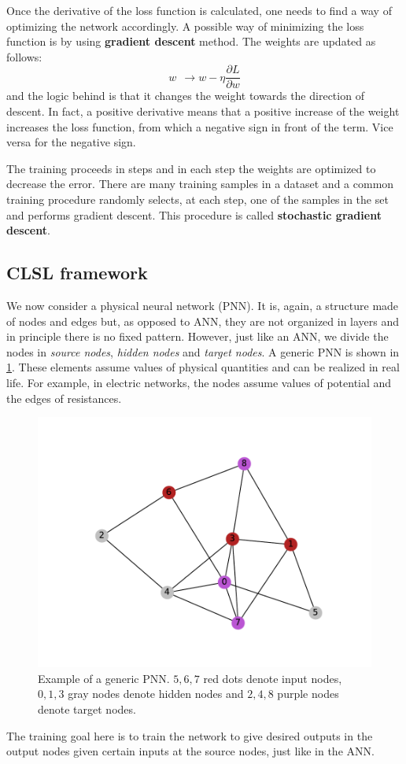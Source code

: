 \documentclass[10.5pt]{article}
\begin{document}
Once the derivative of the loss function is calculated, one needs to find a way of optimizing the network accordingly. A possible way of minimizing the loss function is by using \textbf{gradient descent} method. The weights are updated as follows:
\[
w \ \ \rightarrow w - \eta \frac{\partial L}{\partial w}    
\]
and the logic behind is that it changes the weight towards the direction of descent. In fact, a positive derivative means that a positive increase of the weight increases the loss function, from which a negative sign in front of the term. Vice versa for the negative sign. 

The training proceeds in steps and in each step the weights are optimized to decrease the error. There are many training samples in a dataset and a common training procedure randomly selects, at each step, one of the samples in the set and performs gradient descent. This procedure is called \textbf{stochastic gradient descent}.

\newpage

\subsection{CLSL framework}

We now consider a physical neural network (PNN). It is, again, a structure made of nodes and edges but, as opposed to ANN, they are not organized in layers and in principle there is no fixed pattern. However, just like an ANN, we divide the nodes in \textit{source nodes}, \textit{hidden nodes} and \textit{target nodes}. A generic PNN is shown in \cref{fig:general_graph}. These elements assume values of physical quantities and can be realized in real life. For example, in electric networks, the nodes assume values of potential and the edges of resistances.
\begin{figure}[h]
    \centering
    \includegraphics[width=0.6\columnwidth]{../figures_tex/general_graph.pdf}
    \caption{Example of a generic PNN. $5,6,7$ red dots denote input nodes, $0,1,3$ gray nodes denote hidden nodes and $2,4,8$ purple nodes denote target nodes.}
    \label{fig:general_graph}
\end{figure} 
The training goal here is to train the network to give desired outputs in the output nodes given certain inputs at the source nodes, just like in the ANN.
\end{document}

